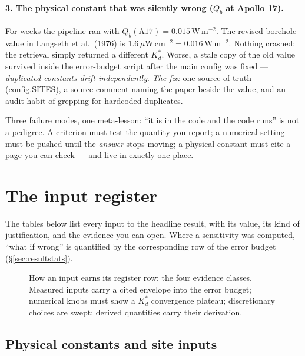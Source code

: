 \documentclass[11pt]{report}
\newcommand{\code}[1]{{\ttfamily\small #1}}
\begin{document}
\paragraph{\textbf{3. The physical constant that was silently wrong
($Q_b$ at Apollo 17).}} For weeks the pipeline ran with $Q_b(\mathrm{A17})=
0.015$\,W\,m$^{-2}$. The revised borehole value in Langseth et al.\ (1976) is
$1.6\,\mu$W\,cm$^{-2} = 0.016$\,W\,m$^{-2}$. Nothing crashed; the retrieval
simply returned a different $K_d^{*}$. Worse, a stale copy of the old value
survived inside the error-budget script after the main config was fixed ---
\emph{duplicated constants drift independently}. \emph{The fix:} one source of
truth (\code{config.SITES}), a source comment naming the paper beside the
value, and an audit habit of grepping for hardcoded duplicates.

\begin{keypt}
Three failure modes, one meta-lesson: ``it is in the code and the code runs''
is not a pedigree. A criterion must test the quantity you report; a numerical
setting must be pushed until the \emph{answer} stops moving; a physical
constant must cite a page you can check --- and live in exactly one place.
\end{keypt}

\section{The input register}\label{sec:register}

The tables below list every input to the headline result, with its value, its
kind of justification, and the evidence you can open. Where a sensitivity was
computed, ``what if wrong'' is quantified by the corresponding row of the
error budget (\S\ref{sec:resultstats}).

\begin{figure}[htbp]\centering

\caption{How an input earns its register row: the four evidence classes.
Measured inputs carry a cited envelope into the error budget; numerical
knobs must show a $K_d^{*}$ convergence plateau; discretionary choices are
swept; derived quantities carry their derivation.}
\label{fig:registerflow}
\end{figure}

\subsection*{Physical constants and site inputs}
\end{document}
